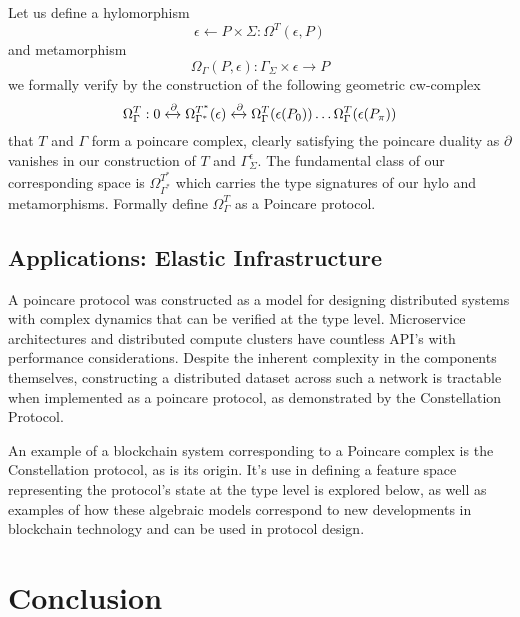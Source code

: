 \documentclass[runningheads]{llncs}
\begin{document}
Let us define a hylomorphism
\begin{equation}
\epsilon \leftarrow P \times \Sigma  : \Omega^T(\epsilon, P)
\end{equation}
and metamorphism
\begin{equation}
\Omega_\Gamma(P, \epsilon):\Gamma_\Sigma \times \epsilon \rightarrow P  
\end{equation} 
we formally verify by the construction of the following geometric cw-complex
\begin{equation}
\Omega^T_\Gamma: 0 \xleftrightarrow{\partial} \Omega^{T^*}_{\Gamma^*}(\epsilon) \xleftrightarrow{\partial}  \Omega^T_\Gamma (\epsilon(P_0)) \dots \Omega^T_\Gamma (\epsilon(P_\pi))
\end{equation}
that $T$ and $\Gamma$ form a poincare complex, clearly satisfying the poincare duality as $\partial$ vanishes in our construction of $T$ and $\Gamma^\epsilon_\Sigma$. The fundamental class of our corresponding space is $\Omega^{T^*}_{\Gamma^*}$ which carries the type signatures of our hylo and metamorphisms. Formally define $\Omega^{T}_{\Gamma}$  as a Poincare protocol.

\subsection{Applications: Elastic Infrastructure}
A poincare protocol was constructed as a model for designing distributed systems with complex dynamics that can be verified at the type level. Microservice architectures and distributed compute clusters have countless API's with performance considerations. Despite the inherent complexity in the components themselves, constructing a distributed dataset across such a network is tractable when implemented as a poincare protocol, as demonstrated by the Constellation Protocol.

An example of a blockchain system corresponding to a Poincare complex is the Constellation protocol, as is its origin. It's use in defining a feature space representing the protocol's state at the type level is explored below, as well as examples of how these algebraic models correspond to new developments in blockchain technology and can be used in protocol design.

\section{Conclusion} 
\end{document}
